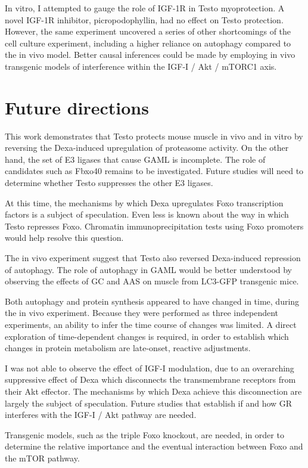 \documentclass[12pt,english]{report}\usepackage[]{graphicx}\usepackage[]{color}
\begin{document}
In vitro, I attempted to gauge the role of IGF-1R in Testo myoprotection.
A novel IGF-1R inhibitor, picropodophyllin, had no effect on Testo
protection. However, the same experiment uncovered a series of other
shortcomings of the cell culture experiment, including a higher reliance
on autophagy compared to the in vivo model. Better causal inferences
could be made by employing in vivo transgenic models of interference
within the IGF-I / Akt / mTORC1 axis.


\section{Future directions}

This work demonstrates that Testo protects mouse muscle in vivo and
in vitro by reversing the Dexa-induced upregulation of proteasome
activity. On the other hand, the set of E3 ligases that cause GAML
is incomplete. The role of candidates such as Fbxo40 remains to be
investigated. Future studies will need to determine whether Testo
suppresses the other E3 ligases.

At this time, the mechanisms by which Dexa upregulates Foxo transcription
factors is a subject of speculation. Even less is known about the
way in which Testo represses Foxo. Chromatin immunoprecipitation tests
using Foxo promoters would help resolve this question.

The in vivo experiment suggest that Testo also reversed Dexa-induced
repression of autophagy. The role of autophagy in GAML would be better
understood by observing the effects of GC and AAS on muscle from LC3-GFP
transgenic mice.

Both autophagy and protein synthesis appeared to have changed in time,
during the in vivo experiment. Because they were performed as three
independent experiments, an ability to infer the time course of changes
was limited. A direct exploration of time-dependent changes is required,
in order to establish which changes in protein metabolism are late-onset,
reactive adjustments.

I was not able to observe the effect of IGF-I modulation, due to an
overarching suppressive effect of Dexa which disconnects the transmembrane
receptors from their Akt effector. The mechanisms by which Dexa achieve
this disconnection are largely the subject of speculation. Future
studies that establish if and how GR interferes with the IGF-I / Akt
pathway are needed.

Transgenic models, such as the triple Foxo knockout, are needed, in
order to determine the relative importance and the eventual interaction
between Foxo and the mTOR pathway. 
\end{document}
